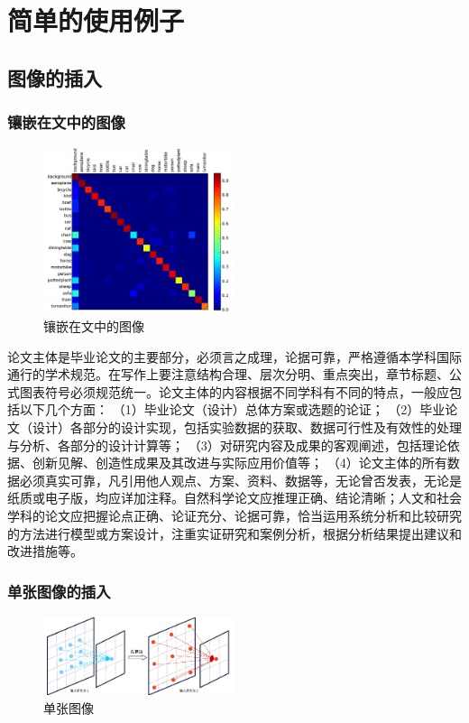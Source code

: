 \chapter{简单的使用例子}
\label{cha:example}
\section{图像的插入}
\subsection{镶嵌在文中的图像}
\label{sec:Images}
\begin{figure}
	\centering
	\includegraphics[width=0.5\textwidth]{image/result/confusion.pdf}
	\caption{镶嵌在文中的图像}
	\label{fig:confusion}
\end{figure}
论文主体是毕业论文的主要部分，必须言之成理，论据可靠，严格遵循本学科国际通行的学术规范。在写作上要注意结构合理、层次分明、重点突出，章节标题、公式图表符号必须规范统一。论文主体的内容根据不同学科有不同的特点，一般应包括以下几个方面： （1）毕业论文（设计）总体方案或选题的论证； （2）毕业论文（设计）各部分的设计实现，包括实验数据的获取、数据可行性及有效性的处理与分析、各部分的设计计算等； （3）对研究内容及成果的客观阐述，包括理论依据、创新见解、创造性成果及其改进与实际应用价值等； （4）论文主体的所有数据必须真实可靠，凡引用他人观点、方案、资料、数据等，无论曾否发表，无论是纸质或电子版，均应详加注释。自然科学论文应推理正确、结论清晰；人文和社会学科的论文应把握论点正确、论证充分、论据可靠，恰当运用系统分析和比较研究的方法进行模型或方案设计，注重实证研究和案例分析，根据分析结果提出建议和改进措施等。
\subsection{单张图像的插入}

\begin{figure}[h]
	\centering
	\includegraphics[width=0.5\textwidth]{image/illustration/hole.pdf}
	\caption{单张图像}
 	\label{fig:hole}
\end{figure}


